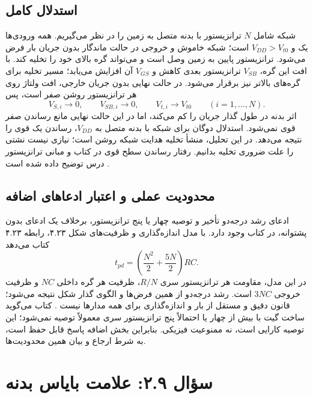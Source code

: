 \documentclass[12pt,a4paper]{article}
\newcommand{\exnum}[1]{\mbox{\beginL#1\endL}}
\newcommand{\bookpages}[2]{صفحات چاپی #1، صفحات #2 فایل \lr{PDF}}
\begin{document}
\subsection*{استدلال کامل}
شبکه  شامل \(N\) ترانزیستور  با بدنه متصل به زمین را در نظر می‌گیریم. همه ورودی‌ها یک و \(V_{DD}>V_{t0}\) است؛ شبکه  خاموش و خروجی در حالت ماندگار بدون جریان بار فرض می‌شود. ترانزیستور پایین به زمین وصل است و می‌تواند گره بالای خود را تخلیه کند. با افت این گره، \(V_{SB}\) ترانزیستور بعدی کاهش و \(V_{GS}\) آن افزایش می‌یابد؛ مسیر تخلیه برای گره‌های بالاتر نیز برقرار می‌شود. در حالت نهایی بدون جریان خارجی، افت ولتاژ روی هر ترانزیستور روشن صفر است، پس
\begin{equation}
 V_{S,i}\longrightarrow0,\qquad V_{SB,i}\longrightarrow0,
 \qquad V_{t,i}\longrightarrow V_{t0}\qquad (i=1,\ldots,N).
 \label{eq:stack-dc}
\end{equation}
اثر بدنه در طول گذار جریان را کم می‌کند، اما در این حالت نهایی مانع رساندن صفر قوی نمی‌شود. استدلال دوگان برای شبکه  با بدنه متصل به \(V_{DD}\)، رساندن یک قوی را نتیجه می‌دهد. در این تحلیل، منشأ تخلیه هدایت شبکه روشن است؛ نیازی نیست نشتی را علت ضروری تخلیه بدانیم. رفتار رساندن سطح قوی در کتاب و مبانی ترانزیستور درس توضیح داده شده است \cite[بخش \exnum{۲.۵.۴} و خلاصه فصل در صفحه چاپی ۹۵]{weste}\cite[اسلایدهای ۶ تا ۱۳]{mosfet}.

\subsection*{محدودیت عملی و اعتبار ادعاهای اضافه}
ادعای رشد درجه‌دو تأخیر و توصیه چهار یا پنج ترانزیستور، برخلاف یک ادعای بدون پشتوانه، در کتاب وجود دارد. با مدل اندازه‌گذاری و ظرفیت‌های شکل \exnum{۴.۲۳}، رابطه \exnum{۴.۲۳} کتاب می‌دهد
\begin{equation}
 t_{pd}=\left(\frac{N^2}{2}+\frac{5N}{2}\right)RC.
 \label{eq:elmore}
\end{equation}
در این مدل، مقاومت هر ترانزیستور سری \(R/N\)، ظرفیت هر گره داخلی \(NC\) و ظرفیت خروجی \(3NC\) است. رشد درجه‌دو از همین فرض‌ها و الگوی گذار شکل نتیجه می‌شود؛ قانون دقیق و مستقل از بار و اندازه‌گذاری برای همه مدارها نیست \cite[\bookpages{۱۵۷ و ۱۵۸}{۱۸۴ و ۱۸۵}]{weste}. کتاب می‌گوید ساخت گیت با بیش از چهار یا احتمالاً پنج ترانزیستور سری معمولاً توصیه نمی‌شود؛ این توصیه کارایی است، نه ممنوعیت فیزیکی. بنابراین بخش اضافه پاسخ قابل حفظ است، به شرط ارجاع و بیان همین محدودیت‌ها.

\section*{سؤال \exnum{۲.۹}: علامت بایاس بدنه}
\end{document}
